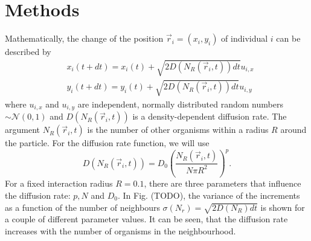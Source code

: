\documentclass{article}
\begin{document}


\section{Methods}
Mathematically, the change of the position $\vec{r}_i = (x_i, y_i)$ of individual $i$ can be described by
\begin{align}
    & x_i(t + dt) = x_i(t) + \sqrt{2D(N_R(\vec{r}_i, t)) dt} u_{i,x} \\
    & y_i(t + dt) = y_i(t) + \sqrt{2D(N_R(\vec{r}_i, t)) dt} u_{i,y}
\end{align}
where $u_{i,x}$ and $u_{i,y}$ are independent, normally distributed random numbers $\sim \mathcal{N}(0,1)$ and $D(N_R(\vec{r}_i, t))$ is a density-dependent diffusion rate.
The argument $N_R(\vec{r}_i, t)$ is the number of other organisms within a radius $R$ around the particle. 
For the diffusion rate function, we will use
\begin{equation}
    D(N_R(\vec{r}_i, t)) = D_0\left( \frac{N_R(\vec{r}_i, t)}{N\pi R^2} \right)^p.
\end{equation}
For a fixed interaction radius $R=0.1$, there are three parameters that influence the diffusion rate: $p, N$ and $D_0$.
In Fig. (TODO), the variance of the increments as a function of the number of neighbours $\sigma(N_r) = \sqrt{2D(N_R) dt}$ is shown for a couple of different parameter values.
It can be seen, that the diffusion rate increases with the number of organisms in the neighbourhood.
\end{document}
